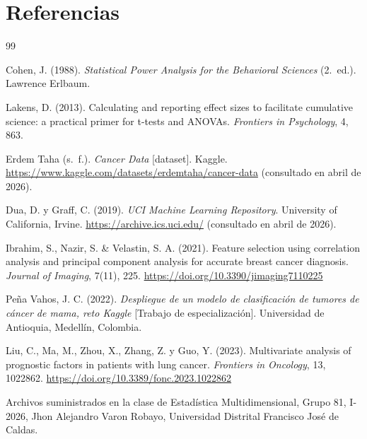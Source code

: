 \documentclass[12pt,a4paper]{article}
\begin{document}
\newpage
\section*{Referencias}
\begin{thebibliography}{99}

Cohen, J. (1988). \textit{Statistical Power Analysis for the Behavioral Sciences} (2.\ ed.). Lawrence Erlbaum.

Lakens, D. (2013). Calculating and reporting effect sizes to facilitate cumulative science: a practical primer for t-tests and ANOVAs. \textit{Frontiers in Psychology}, 4, 863.

Erdem Taha (s.\ f.). \textit{Cancer Data} [dataset]. Kaggle. \url{https://www.kaggle.com/datasets/erdemtaha/cancer-data} (consultado en abril de 2026).

Dua, D. y Graff, C. (2019). \textit{UCI Machine Learning Repository}. University of California, Irvine. \url{https://archive.ics.uci.edu/} (consultado en abril de 2026).

Ibrahim, S., Nazir, S. \& Velastin, S. A. (2021). Feature selection using correlation analysis and principal component analysis for accurate breast cancer diagnosis. \textit{Journal of Imaging}, 7(11), 225. \url{https://doi.org/10.3390/jimaging7110225}

Peña Vahos, J. C. (2022). \textit{Despliegue de un modelo de clasificación de tumores de cáncer de mama, reto Kaggle} [Trabajo de especialización]. Universidad de Antioquia, Medellín, Colombia.

Liu, C., Ma, M., Zhou, X., Zhang, Z. y Guo, Y. (2023). Multivariate analysis of prognostic factors in patients with lung cancer. \textit{Frontiers in Oncology}, 13, 1022862. \url{https://doi.org/10.3389/fonc.2023.1022862}

Archivos suministrados en la clase de Estadística Multidimensional, Grupo 81, I-2026, Jhon Alejandro Varon Robayo, Universidad Distrital Francisco José de Caldas.

\end{thebibliography}
\end{document}
